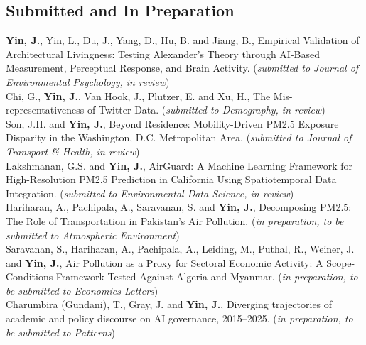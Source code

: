 \documentclass[11pt, a4paper]{article}
\newcommand{\years}[1]{\marginnote{\scriptsize #1}}
\begin{document}
\subsection*{Submitted and In Preparation}
\years{2026}\textbf{Yin, J.}, Yin, L., Du, J., Yang, D., Hu, B. and Jiang, B., Empirical Validation of Architectural Livingness: Testing Alexander’s Theory through AI-Based Measurement, Perceptual Response, and Brain Activity. (\textit{submitted to Journal of Environmental Psychology, in review})\\
\years{2026}Chi, G., \textbf{Yin, J.}, Van Hook,  J., Plutzer, E. and Xu, H., The Mis-representativeness of Twitter Data. (\textit{submitted to Demography, in review})\\
\years{2026}Son, J.H. and \textbf{Yin, J.}, Beyond Residence: Mobility-Driven PM2.5 Exposure Disparity in the Washington, D.C. Metropolitan Area. (\textit{submitted to Journal of Transport \& Health, in review})\\
\years{2026}Lakshmanan, G.S. and \textbf{Yin, J.}, AirGuard: A Machine Learning Framework for High-Resolution PM2.5 Prediction in California Using Spatiotemporal Data Integration. (\textit{submitted to Environmental Data Science, in review})\\
\years{2026}Hariharan, A., Pachipala, A., Saravanan, S. and \textbf{Yin, J.}, Decomposing PM2.5: The Role of Transportation in Pakistan’s Air Pollution. (\textit{in preparation, to be submitted to Atmospheric Environment})\\
\years{2026}Saravanan, S., Hariharan, A., Pachipala, A., Leiding, M., Puthal, R., Weiner, J. and \textbf{Yin, J.}, Air Pollution as a Proxy for Sectoral Economic Activity: A Scope-Conditions Framework Tested Against Algeria and Myanmar. (\textit{in preparation, to be submitted to Economics Letters})\\
\years{2026}Charumbira (Gundani), T., Gray, J. and \textbf{Yin, J.}, Diverging trajectories of academic and policy discourse on AI governance, 2015--2025. (\textit{in preparation, to be submitted to Patterns})\\
\end{document}
